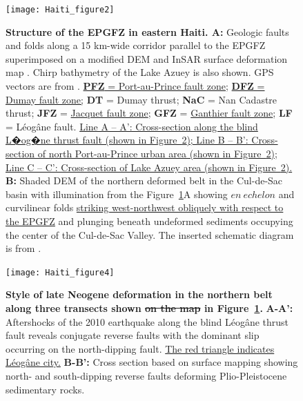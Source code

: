 \documentclass[linenumbers,draft]{agujournal}
\begin{document}
\begin{figure}
\centering
\texttt{[image: Haiti\_figure2]}
\caption{\textbf{Structure of the EPGFZ in eastern Haiti. A:} Geologic faults and folds along a 15 km-wide corridor parallel to the EPGFZ superimposed on a modified DEM and InSAR surface deformation map \citep{hayes2010complex,hashimoto2011fan}. Chirp bathymetry of the Lake Azuey is also shown. GPS vectors are from \citet{calais2010transpressional}. \underline{\textbf{PFZ} = Port-au-Prince fault zone}; \underline{\textbf{DFZ} = Dumay fault zone;} \textbf{DT} = Dumay thrust; \textbf{NaC} = Nan Cadastre thrust; \textbf{JFZ} = \ul{Jacquet fault zone}; \textbf{GFZ} = \ul{Ganthier fault zone}; \textbf{LF} = L\'eog\^ane fault. \ul{Line A -- A': Cross-section along the blind L�og�ne thrust fault (shown in Figure~{\ref{figure3}}); Line B -- B': Cross-section of north Port-au-Prince urban area (shown in Figure~{\ref{figure3}}); Line C -- C': Cross-section of Lake Azuey area (shown in Figure~{\ref{figure3}}).} \textbf{B:} Shaded DEM of the northern deformed belt in the Cul-de-Sac basin with illumination from the Figure~\ref{figure2}A showing $en~echelon$ and curvilinear folds \underline{striking west-northwest obliquely with respect to the EPGFZ} and plunging beneath undeformed sediments occupying the center of the Cul-de-Sac Valley. The inserted schematic diagram is from \citet{odonne1983analogue}.}
\label{figure2}
\end{figure}

\begin{figure}
\centering
\texttt{[image: Haiti\_figure4]}
\caption{\textbf{Style of late Neogene deformation in the northern belt along three transects shown \st{on the map} in Figure~\ref{figure2}.} \textbf{A-A':} Aftershocks of the 2010 earthquake \underline{\citep{douilly2013crustal}} along the blind L\'eog\^ane thrust fault reveals conjugate reverse faults with the dominant slip occurring on the north-dipping fault. \ul{The red triangle indicates L\'eog\^ane city.} \textbf{B-B':} Cross section based on surface mapping \underline{\citep{massoni1955haiti,cox2011shear,mchugh2011offshore,saint2015seismotectonics}} showing north- and south-dipping reverse faults deforming Plio-Pleistocene sedimentary rocks.}
\label{figure3}
\end{figure}
\end{document}
